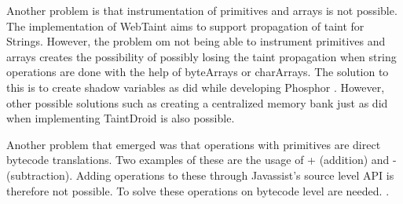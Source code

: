 Another problem is that instrumentation of primitives and arrays is not possible. The implementation of WebTaint aims to support propagation of taint for Strings. However, the problem om not being able to instrument primitives and arrays creates the possibility of possibly losing the taint propagation when string operations are done with the help of byteArrays or charArrays. The solution to this is to create shadow variables as \textcite{BellJ.2014PIdd} did while developing Phosphor \parencite{phosphor}. However, other possible solutions such as creating a centralized memory bank just as \textcite{EnckWilliam2014Taif} did when implementing TaintDroid is also possible.

Another problem that emerged was that operations with primitives are direct bytecode translations. Two examples of these are the usage of + (addition) and - (subtraction). Adding operations to these through Javassist's source level API is therefore not possible. To solve these operations on bytecode level are needed. \parencite{Javassist}.